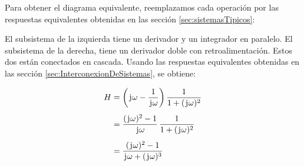 \begin{mdframed}[style=ExampleFrame]

    Para obtener el diagrama equivalente, reemplazamos cada operación por las respuestas equivalentes obtenidas en las sección \ref{sec:sistemasTipicos}:

    \begin{center}
        \def\svgwidth{\linewidth}
        
    \end{center}


    El subsistema de la izquierda tiene un derivador y un integrador en paralelo.
    El subsistema de la derecha, tiene un derivador doble con retroalimentación.
    Estos dos están conectados en cascada.
    Usando las respuestas equivalentes obtenidas en las sección \ref{sec:InterconexionDeSistemas}, se obtiene:

    \begin{align*}
        H
        &= \left(\mkern2mu\mathrm{j}\mkern1mu \omega - \frac{1}{\mkern2mu\mathrm{j}\mkern1mu \omega}\right) \frac{1}{1 + (\mkern2mu\mathrm{j}\mkern1mu \omega)^2}
        \\[1ex]
        &= \frac{(\mkern2mu\mathrm{j}\mkern1mu \omega)^2 - 1}{\mkern2mu\mathrm{j}\mkern1mu \omega} \, \frac{1}{1 + (\mkern2mu\mathrm{j}\mkern1mu \omega)^2}
        \\[1ex]
        &= \frac{(\mkern2mu\mathrm{j}\mkern1mu \omega)^2 - 1}{\mkern2mu\mathrm{j}\mkern1mu \omega + (\mkern2mu\mathrm{j}\mkern1mu \omega)^3}
    \end{align*}
\end{mdframed}
